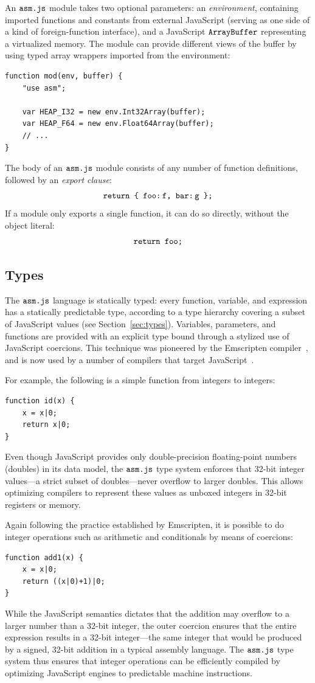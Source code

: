 \documentclass{article}
\newcommand{\mathjs}[1]{\mbox{\texttt{{#1}}}}
\newcommand{\return}[1]{\mathjs{return }{#1}\mathjs{;}}
\begin{document}
An $\mathjs{asm.js}$ module takes two optional parameters: an {\it
environment}, containing imported functions and constants from
external JavaScript (serving as one side of a kind of foreign-function
interface), and a JavaScript $\mathjs{ArrayBuffer}$ representing a
virtualized memory. The module can provide different views of the
buffer by using typed array wrappers imported from the environment:
\begin{verbatim}
function mod(env, buffer) {
    "use asm";

    var HEAP_I32 = new env.Int32Array(buffer);
    var HEAP_F64 = new env.Float64Array(buffer);
    // ...
}
\end{verbatim}

The body of an $\mathjs{asm.js}$ module consists of any number of
function definitions, followed by an {\it export clause}:
\[
\return{\mathjs{\char123{} foo:\,f, bar:\,g \char125{}}}
\]
If a module only exports a single function, it can do so directly,
without the object literal:
\[
\return{\mathjs{foo}}
\]

\subsection{Types}

The $\mathjs{asm.js}$ language is statically typed: every function,
variable, and expression has a statically predictable type, according
to a type hierarchy covering a subset of JavaScript values (see
Section~\ref{sec:types}). Variables, parameters, and functions are
provided with an explicit type bound through a stylized use of
JavaScript coercions. This technique was pioneered by the Emscripten
compiler~\cite{emscripten}, and is now used by a number of compilers
that target JavaScript~\cite{mandreel,lljs}.

For example, the following is a simple function from integers to
integers:
\begin{verbatim}
function id(x) {
    x = x|0;
    return x|0;
}
\end{verbatim}
Even though JavaScript provides only double-precision floating-point
numbers (doubles) in its data model, the $\mathjs{asm.js}$ type system
enforces that 32-bit integer values---a strict subset of
doubles---never overflow to larger doubles. This allows optimizing
compilers to represent these values as unboxed integers in 32-bit
registers or memory.

Again following the practice established by Emscripten, it is possible
to do integer operations such as arithmetic and conditionals by means
of coercions:
\begin{verbatim}
function add1(x) {
    x = x|0;
    return ((x|0)+1)|0;
}
\end{verbatim}
While the JavaScript semantics dictates that the addition may overflow
to a larger number than a 32-bit integer, the outer coercion ensures
that the entire expression results in a 32-bit integer---the same
integer that would be produced by a signed, 32-bit addition in a
typical assembly language. The $\mathjs{asm.js}$ type system thus
ensures that integer operations can be efficiently compiled by
optimizing JavaScript engines to predictable machine instructions.
\end{document}
